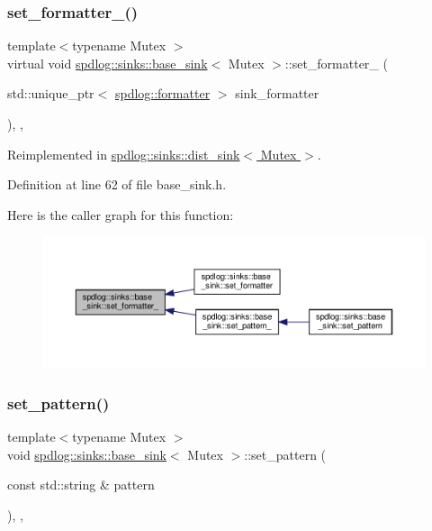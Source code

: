 \subsubsection{\texorpdfstring{set\+\_\+formatter\+\_\+()}{set\_formatter\_()}}
{\footnotesize\ttfamily template$<$typename Mutex $>$ \\
virtual void \hyperlink{classspdlog_1_1sinks_1_1base__sink}{spdlog\+::sinks\+::base\+\_\+sink}$<$ Mutex $>$\+::set\+\_\+formatter\+\_\+ (\begin{DoxyParamCaption}\item[{std\+::unique\+\_\+ptr$<$ \hyperlink{classspdlog_1_1formatter}{spdlog\+::formatter} $>$}]{sink\+\_\+formatter }\end{DoxyParamCaption})\hspace{0.3cm}{\ttfamily [inline]}, {\ttfamily [protected]}, {\ttfamily [virtual]}}



Reimplemented in \hyperlink{classspdlog_1_1sinks_1_1dist__sink_a5e83e285fcceaab7ee4c4736c2decef0}{spdlog\+::sinks\+::dist\+\_\+sink$<$ Mutex $>$}.



Definition at line 62 of file base\+\_\+sink.\+h.

Here is the caller graph for this function\+:
\nopagebreak
\begin{figure}[H]
\begin{center}
\leavevmode
\includegraphics[width=350pt]{classspdlog_1_1sinks_1_1base__sink_aed93aabfba62b684e603eb525671c864_icgraph}
\end{center}
\end{figure}
\mbox{\label{classspdlog_1_1sinks_1_1base__sink_a2b0a0b95f1e7272b443de67b46914152}} 
\subsubsection{\texorpdfstring{set\+\_\+pattern()}{set\_pattern()}}
{\footnotesize\ttfamily template$<$typename Mutex $>$ \\
void \hyperlink{classspdlog_1_1sinks_1_1base__sink}{spdlog\+::sinks\+::base\+\_\+sink}$<$ Mutex $>$\+::set\+\_\+pattern (\begin{DoxyParamCaption}\item[{const std\+::string \&}]{pattern }\end{DoxyParamCaption})\hspace{0.3cm}{\ttfamily [inline]}, {\ttfamily [final]}, {\ttfamily [virtual]}}



